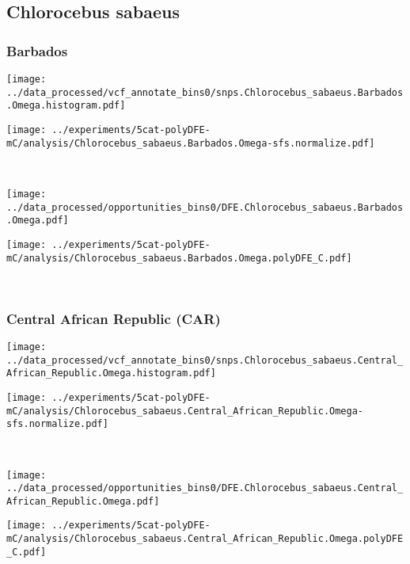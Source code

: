 \subsection{Chlorocebus sabaeus}

\subsubsection{Barbados}

\begin{minipage}{0.49\linewidth}
    \texttt{[image: ../data\_processed/vcf\_annotate\_bins0/snps.Chlorocebus\_sabaeus.Barbados.Omega.histogram.pdf]}
\end{minipage}
\begin{minipage}{0.49\linewidth}
    \texttt{[image: ../experiments/5cat-polyDFE-mC/analysis/Chlorocebus\_sabaeus.Barbados.Omega-sfs.normalize.pdf]}
\end{minipage}
\\
\begin{minipage}{0.49\linewidth}
    \texttt{[image: ../data\_processed/opportunities\_bins0/DFE.Chlorocebus\_sabaeus.Barbados.Omega.pdf]}
\end{minipage}
\begin{minipage}{0.49\linewidth}
    \texttt{[image: ../experiments/5cat-polyDFE-mC/analysis/Chlorocebus\_sabaeus.Barbados.Omega.polyDFE\_C.pdf]}
\end{minipage}
\\

\subsubsection{Central African Republic (CAR)}

\begin{minipage}{0.49\linewidth}
    \texttt{[image: ../data\_processed/vcf\_annotate\_bins0/snps.Chlorocebus\_sabaeus.Central\_African\_Republic.Omega.histogram.pdf]}
\end{minipage}
\begin{minipage}{0.49\linewidth}
    \texttt{[image: ../experiments/5cat-polyDFE-mC/analysis/Chlorocebus\_sabaeus.Central\_African\_Republic.Omega-sfs.normalize.pdf]}
\end{minipage}
\\
\begin{minipage}{0.49\linewidth}
    \texttt{[image: ../data\_processed/opportunities\_bins0/DFE.Chlorocebus\_sabaeus.Central\_African\_Republic.Omega.pdf]}
\end{minipage}
\begin{minipage}{0.49\linewidth}
    \texttt{[image: ../experiments/5cat-polyDFE-mC/analysis/Chlorocebus\_sabaeus.Central\_African\_Republic.Omega.polyDFE\_C.pdf]}
\end{minipage}
\\

